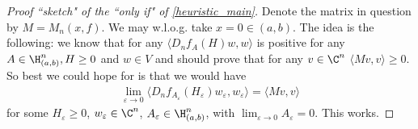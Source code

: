 \begin{proof}[Proof ``sketch" of the ``only if" of \ref{heuristic_main}]
	Denote the matrix in question by $M = M_{n}(x, f)$. We may w.l.o.g. take $x = 0 \in (a, b)$. The idea is the following: we know that for any $\langle D_{n} f_{A} (H) w, w \rangle$ is positive for any $A \in \H^{n}_{(a, b)}, H \geq 0$ and $w \in V$ and should prove that for any $v \in \C^{n}$ $\langle M v, v \rangle \geq 0$. So best we could hope for is that we would have
	\begin{align*}
		\lim_{\varepsilon \to 0} \langle D_{n} f_{A_{\varepsilon}} (H_{\varepsilon}) w_{\varepsilon}, w_{\varepsilon} \rangle = \langle M v, v \rangle
	\end{align*}
	for some $H_{\varepsilon} \geq 0$, $w_{\varepsilon} \in \C^{n}$, $A_{\varepsilon} \in \H^{n}_{(a, b)}$, with $\lim_{\varepsilon \to 0} A_{\varepsilon} = 0$. This works.


\end{proof}
